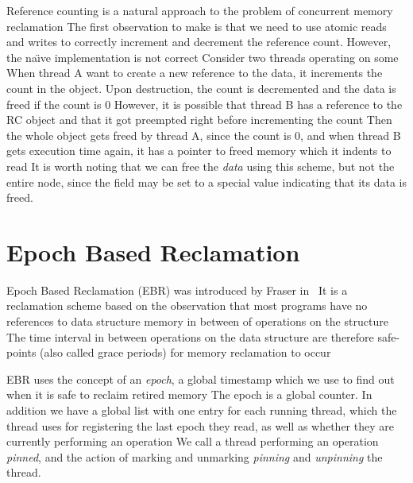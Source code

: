 \documentclass[b5paper]{report}
\begin{document}
 Reference counting
is a natural approach to the problem of concurrent memory reclamation The
first observation to make is that we need to use atomic reads and writes to
correctly increment and decrement the reference count. However, the na\"\i{}ve
implementation is not correct Consider two threads operating on some
 When thread A want to create a new reference to the data, it
increments the count in the  object. Upon destruction, the count is
decremented and the data is freed if the count is 0 However, it is possible
that thread B has a reference to the RC object and that it got preempted right
before incrementing the count Then the whole object gets freed by thread A,
since the count is 0, and when thread B gets execution time again, it has a
pointer to freed memory which it indents to read It is worth noting that we
can free the \emph{data} using this scheme, but not the entire  node,
since the  field may be set to a special value indicating that its
data is freed.



%

\section{Epoch Based Reclamation}
Epoch Based Reclamation (EBR) was introduced by Fraser
in~\cite{fraser2004practical} It is a reclamation scheme based on the
observation that most programs have no references to data structure memory in
between of operations on the structure The time interval in between
operations on the data structure are therefore safe-points (also called grace
periods) for memory reclamation to occur 

EBR uses the concept of an \emph{epoch}, a global timestamp which we use to
find out when it is safe to reclaim retired memory The epoch is a global
counter. In addition we have a global list with one entry for each running
thread, which the thread uses for registering the last epoch they read, as well
as whether they are currently performing an operation We call a thread
performing an operation \emph{pinned}, and the action of marking and unmarking
\emph{pinning} and \emph{unpinning} the thread.
\end{document}
